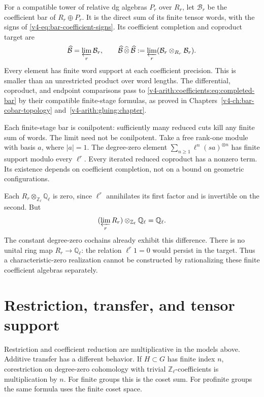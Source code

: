 For a compatible tower of relative dg algebras \(P_r\) over \(R_r\),
let \(\mathcal B_r\) be the coefficient bar of \(R_r\oplus P_r\).
It is the direct sum of its finite tensor words, with the signs of
\eqref{v4-eq:bar-coefficient-signs}. Its coefficient completion and
coproduct target are
\begin{equation}\label{v4-arith:coefficients:eq:completed-bar}
 \widehat{\mathcal B}=\varprojlim_r\mathcal B_r,
 \qquad
 \widehat{\mathcal B}\,\widehat\otimes\,
 \widehat{\mathcal B}
 :=\varprojlim_r(\mathcal B_r\otimes_{R_r}\mathcal B_r).
\end{equation}
Every element has finite word support at each coefficient precision.
This is smaller than an unrestricted product over word lengths.
The differential, coproduct, and endpoint comparisons pass to
\eqref{v4-arith:coefficients:eq:completed-bar} by their compatible
finite-stage formulas, as proved in
Chapters~\ref{v4-ch:bar-cobar-topology}
and~\ref{v4-arith:gluing:chapter}.

Each finite-stage bar is conilpotent: sufficiently many reduced cuts
kill any finite sum of words. The limit need not be conilpotent.
Take a free rank-one module with basis \(a\), where \(|a|=1\).
The degree-zero
element \(\sum_{n\geq1}\ell^n(sa)^{\otimes n}\) has finite support
modulo every \(\ell^r\). Every iterated reduced coproduct has a
nonzero term. Its existence depends on coefficient completion, not on a
bound on geometric configurations.

\begin{example}\label{v4-arith:coefficients:ex:rationalization}
Each \(R_r\otimes_{\mathbb Z_\ell}\mathbb Q_\ell\) is zero, since
\(\ell^r\) annihilates its first factor and is invertible on the
second. But
\[
 (\varprojlim_rR_r)\otimes_{\mathbb Z_\ell}\mathbb Q_\ell
 =\mathbb Q_\ell.
\]
The constant degree-zero cochains already exhibit this difference.
There is no unital ring map \(R_r\to\mathbb Q_\ell\): the relation
\(\ell^r1=0\) would persist in the target. Thus a characteristic-zero
realization cannot be constructed by rationalizing these finite
coefficient algebras separately.
\end{example}

\section{Restriction, transfer, and tensor support}
\label{v4-arith:coefficients:sec:transfer}

Restriction and coefficient reduction are multiplicative in the models
above. Additive transfer has a different behavior. If \(H\subset G\)
has finite index \(n\), corestriction on degree-zero cohomology with
trivial \(\mathbb Z_\ell\)-coefficients is multiplication by \(n\).
For finite groups this is the coset sum. For profinite groups the
same formula uses the finite coset space.

